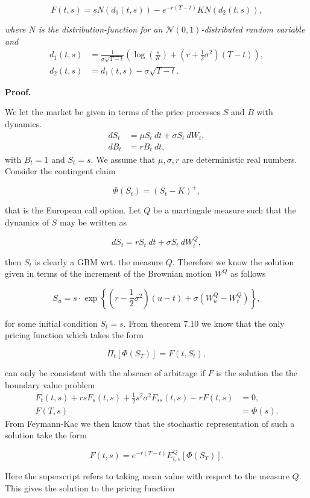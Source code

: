 \documentclass[a4paper,12pt,openany]{book}
\begin{document}
\[
F(t,s)=s N(d_1(t,s))-e^{-r(T-t)}KN(d_2(t,s)),\tag{7.52}
\]

\emph{where \(N\) is the distribution-function for an \(\mathcal{N}(0,1)\)-distributed random variable and}
\begin{align*}
d_1(t,s)&=\frac{1}{\sigma \sqrt{T-t}}\left(\log\left(\frac{s}{K}\right)+\left(r+\frac{1}{2}\sigma^2\right)(T-t)\right),\tag{7.53}\\
d_2(t,s)&=d_1(t,s)-\sigma\sqrt{T-t}.\tag{7.54}
\end{align*}

\textbf{Proof.}

We let the market be given in terms of the price processes \(S\) and \(B\) with dynamics.
\begin{align*}
dS_t&=\mu S_t\ dt+\sigma S_t\ dW_t,\\
dB_t&=r B_t\ dt,
\end{align*}
with \(B_t=1\) and \(S_t=s\). We assume that \(\mu,\sigma, r\) are deterministic real numbers. Consider the contingent claim

\[
\Phi(S_t)=\left( S_t - K\right)^+,
\]

that is the European call option. Let \(Q\) be a martingale measure such that the dynamics of \(S\) may be written as

\[
dS_t=r S_t\ dt+\sigma S_t\ dW^Q_t,
\]

then \(S_t\) is clearly a GBM wrt. the measure \(Q\). Therefore we know the solution given in terms of the increment of the Brownian motion \(W^Q\) as follows

\[
S_u=s\cdot \exp\left\{\left(r-\frac{1}{2}\sigma^2\right)(u-t)+\sigma\left(W_u^Q-W_t^Q\right)\right\},
\]

for some initial condition \(S_t=s\). From theorem 7.10 we know that the only pricing function which takes the form

\[
\Pi_t[\Phi(S_T)]=F(t,S_t),
\]

can only be consistent with the absence of arbitrage if \(F\) is the solution the the boundary value problem
\begin{align*}
F_t(t,s)+rsF_s(t,s)+\frac{1}{2}s^2\sigma^2F_{ss}(t,s)-rF(t,s)&=0,\\
F(T,s)&=\Phi(s).
\end{align*}
From Feymann-Kac we then know that the stochastic representation of such a solution take the form

\[
F(t,s)=e^{-r(T-t)}E_{t,s}^Q[\Phi(S_T)].
\]

Here the superscript refers to taking mean value with respect to the measure \(Q\). This gives the solution to the pricing function
\end{document}
